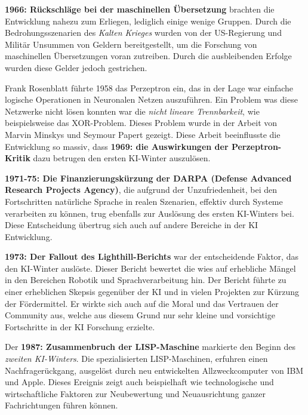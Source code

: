 \textbf{1966: Rückschläge bei der maschinellen Übersetzung} brachten die Entwicklung nahezu zum Erliegen, lediglich einige wenige Gruppen. Durch die Bedrohungsszenarien des \textit{Kalten Krieges} wurden von der US-Regierung und Militär Unsummen von Geldern bereitgestellt, um die Forschung von maschinellen Übersetzungen voran zutreiben. Durch die ausbleibenden Erfolge wurden diese Gelder jedoch gestrichen.\vspace{0.2cm}

Frank Rosenblatt führte 1958 das Perzeptron ein, das in der Lage war einfache logische Operationen in Neuronalen Netzen auszuführen. Ein Problem was diese Netzwerke nicht lösen konnten war die \textit{nicht lineare Trennbarkeit}, wie beispielsweise das XOR-Problem. Dieses Problem wurde in der Arbeit von Marvin Minskys und Seymour Papert gezeigt. Diese Arbeit beeinflusste die Entwicklung so massiv, dass \textbf{1969: die Auswirkungen der Perzeptron-Kritik} dazu betrugen den ersten KI-Winter auszulösen.\vspace{0.2cm}

\textbf{1971-75: Die Finanzierungskürzung der DARPA (Defense Advanced Research Projects Agency)}, die aufgrund der Unzufriedenheit, bei den Fortschritten natürliche Sprache in realen Szenarien, effektiv durch Systeme verarbeiten zu können, trug ebenfalls zur Auslösung des ersten KI-Winters bei. Diese Entscheidung übertrug sich auch auf andere Bereiche in der KI Entwicklung.\vspace{0.2cm}

\textbf{1973: Der Fallout des Lighthill-Berichts} war der entscheidende Faktor, das den KI-Winter auslöste. Dieser Bericht bewertet die wies auf erhebliche Mängel in den Bereichen Robotik und Sprachverarbeitung hin. Der Bericht führte zu einer erheblichen Skepsis gegenüber der KI und in vielen Projekten zur Kürzung der Fördermittel. Er wirkte sich auch auf die Moral und das Vertrauen der Community aus, welche aus diesem Grund nur sehr kleine und vorsichtige Fortschritte in der KI Forschung erzielte.\vspace{0.2cm}

Der \textbf{1987: Zusammenbruch der LISP-Maschine} markierte den Beginn des \textit{zweiten KI-Winters}. Die spezialisierten LISP-Maschinen, erfuhren einen Nachfragerückgang, ausgelöst durch neu entwickelten Allzweckcomputer von IBM und Apple. Dieses Ereignis zeigt auch beispielhaft wie technologische und wirtschaftliche Faktoren zur Neubewertung und Neuausrichtung ganzer Fachrichtungen führen können.\vspace{0.2cm}

